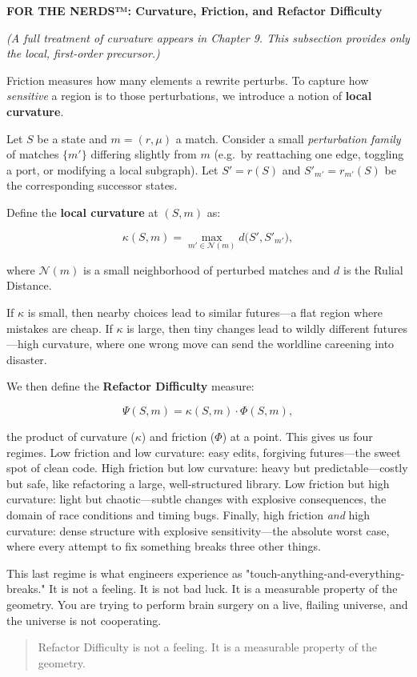 \begin{mdframed}[linewidth=1pt, linecolor=black!50, innertopmargin=8pt, innerbottommargin=8pt]
\noindent\textbf{FOR THE NERDS™: Curvature, Friction, and Refactor Difficulty}

\medskip

\textit{(A full treatment of curvature appears in Chapter 9.
This subsection provides only the local, first-order precursor.)}

Friction measures how many elements a rewrite perturbs. To capture how \emph{sensitive}
a region is to those perturbations, we introduce a notion of \textbf{local curvature}.

Let $S$ be a state and $m = (r,\mu)$ a match. Consider a small \emph{perturbation family}
of matches $\{m'\}$ differing slightly from $m$ (e.g.\ by reattaching one edge, toggling a port,
or modifying a local subgraph). Let $S' = r(S)$ and $S'_{m'} = r_{m'}(S)$ be the corresponding
successor states.

Define the \textbf{local curvature} at $(S,m)$ as:

\[
\kappa(S,m)
= \max_{m' \in \mathcal{N}(m)} d\big(S', S'_{m'}\big),
\]

where $\mathcal{N}(m)$ is a small neighborhood of perturbed matches and
$d$ is the Rulial Distance.

If $\kappa$ is small, then nearby choices lead to similar futures—a flat region where mistakes are
cheap. If $\kappa$ is large, then tiny changes lead to wildly different futures—high curvature, where
one wrong move can send the worldline careening into disaster.

We then define the \textbf{Refactor Difficulty} measure:

\[
\Psi(S,m) = \kappa(S,m) \cdot \Phi(S,m),
\]

the product of curvature ($\kappa$) and friction ($\Phi$) at a point. This gives us four regimes.
Low friction and low curvature: easy edits, forgiving futures—the sweet spot of clean code. High
friction but low curvature: heavy but predictable—costly but safe, like refactoring a large,
well-structured library. Low friction but high curvature: light but chaotic—subtle changes with
explosive consequences, the domain of race conditions and timing bugs. Finally, high friction
\emph{and} high curvature: dense structure with explosive sensitivity—the absolute worst case, where
every attempt to fix something breaks three other things.

This last regime is what engineers experience as "touch-anything-and-everything-breaks." It is not a
feeling. It is not bad luck. It is a measurable property of the geometry. You are trying to perform
brain surgery on a live, flailing universe, and the universe is not cooperating.

\begin{quote}
Refactor Difficulty is not a feeling. It is a measurable property of the geometry.
\end{quote}

\end{mdframed}

